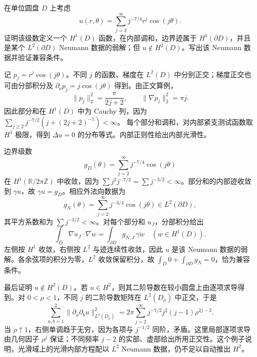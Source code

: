\begin{exercise}\label{g3:ex:rough-neumann-data-harmonic}
	在单位圆盘 \(D\) 上考虑
	\[
	u(r,\theta)=\sum_{j=2}^\infty j^{-7/4}r^j\cos(j\theta).
	\]
	证明该级数定义一个 \(H^1(D)\) 函数，在内部调和，边界迹属于
	\(H^1(\partial D)\)，并且是某个 \(L^2(\partial D)\) Neumann 数据的弱解；但 \(u\notin H^2(D)\)。写出该 Neumann 数据并验证兼容条件。
\end{exercise}
\begin{solution}
	记 \(p_j=r^j\cos(j\theta)\)。不同 \(j\) 的函数、梯度在 \(L^2(D)\) 中分别正交；梯度正交也可由分部积分及
	\(\partial_\nu p_j=j\cos(j\theta)\) 得到。由正文算例，
	\[
	\|p_j\|_2^2=\frac{\pi}{2j+2},\qquad
	\|\nabla p_j\|_2^2=\pi j.
	\]
	因此部分和在 \(H^1(D)\) 中为 Cauchy 列，因为
	\(\sum_{j\ge2}j^{-7/2}(j+(2j+2)^{-1})<\infty\)。
	每个部分和调和，对内部紧支测试函数取 \(H^1\) 极限，得到 \(\Delta u=0\) 的分布等式。内部正则性给出内部光滑性。

	边界级数
	\[
	g_D(\theta)=\sum_{j=2}^\infty j^{-7/4}\cos(j\theta)
	\]
	在 \(H^1(\mathbb R/2\pi\mathbb Z)\) 中收敛，因为
	\(\sum j^2j^{-7/2}=\sum j^{-3/2}<\infty\)。部分和的内部迹收敛到 \(\gamma u\)，故 \(\gamma u=g_D\)。相应外法向数据为
	\[
	g_N(\theta)=\sum_{j=2}^\infty j^{-3/4}\cos(j\theta)\in L^2(\partial D),
	\]
	其平方系数和为 \(\sum j^{-3/2}<\infty\)。对每个部分和 \(u_J\)，分部积分给出
	\[
	\int_D\nabla u_J\cdot\overline{\nabla w}
	=\int_{\partial D}g_{N,J}\,\overline{\gamma w}
	\quad(w\in H^1(D)).
	\]
	左侧按 \(H^1\) 收敛，右侧按 \(L^2\) 与迹连续性收敛，因此 \(u\) 是该 Neumann 数据的弱解。各余弦项的积分为零，\(L^2\) 收敛保留积分，故
	\(\int_D0+\int_{\partial D}g_N=0\)，恰为兼容条件。

	最后证明 \(u\notin H^2(D)\)。若 \(u\in H^2\)，则其二阶导数在较小圆盘上由逐项求导得到。对 \(0<\rho<1\)，不同 \(j\) 的二阶导数矩阵在 \(L^2(D_\rho)\) 中正交，于是
	\[
	\sum_{a,b=1}^2\|\partial_a\partial_bu\|_{L^2(D_\rho)}^2
	=2\pi\sum_{j=2}^\infty j^{-7/2}j^2(j-1)\rho^{2j-2}.
	\]
	当 \(\rho\uparrow1\)，右侧单调趋于无穷，因为各项与 \(j^{-1/2}\) 同阶，矛盾。这里局部逐项求导由几何因子 \(\rho^j\) 保证；不同频率 \(j-2\) 的实部、虚部给出所用正交性。这个例子说明，光滑域上的光滑内部方程配以 \(L^2\) Neumann 数据，仍不足以自动推出 \(H^2\)。
\end{solution}

